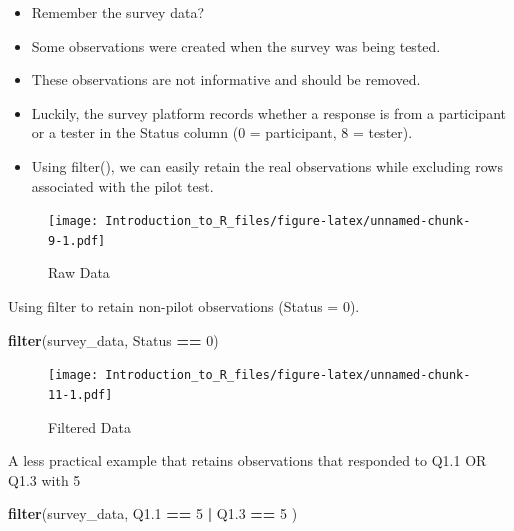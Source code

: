 \documentclass[]{book}
\newenvironment{Shaded}{\begin{snugshade}}{\end{snugshade}}
\newcommand{\DecValTok}[1]{\textcolor[rgb]{0.00,0.00,0.81}{#1}}
\newcommand{\FloatTok}[1]{\textcolor[rgb]{0.00,0.00,0.81}{#1}}
\newcommand{\KeywordTok}[1]{\textcolor[rgb]{0.13,0.29,0.53}{\textbf{#1}}}
\newcommand{\NormalTok}[1]{#1}
\newcommand{\OperatorTok}[1]{\textcolor[rgb]{0.81,0.36,0.00}{\textbf{#1}}}
\newcommand{\StringTok}[1]{\textcolor[rgb]{0.31,0.60,0.02}{#1}}
\providecommand{\tightlist}{%
  \setlength{\itemsep}{0pt}\setlength{\parskip}{0pt}}
\theoremstyle{definition}
\theoremstyle{definition}
\theoremstyle{definition}
\theoremstyle{remark}
\let\BeginKnitrBlock\begin \let\EndKnitrBlock\end
\begin{document}
\begin{itemize}
\tightlist
\item
  Remember the survey data?
\item
  Some observations were created when the survey was being tested.
\item
  These observations are not informative and should be removed.
\item
  Luckily, the survey platform records whether a response is from a participant or a tester in the Status column (0 = participant, 8 = tester).
\item
  Using filter(), we can easily retain the real observations while excluding rows associated with the pilot test.
\end{itemize}

\begin{figure}
\centering
\texttt{[image: Introduction\_to\_R\_files/figure-latex/unnamed-chunk-9-1.pdf]}
\caption{\label{fig:unnamed-chunk-9}Raw Data}
\end{figure}

\BeginKnitrBlock{example}
\protect\hypertarget{exm:filter1}{}{\label{exm:filter1} }Using filter to retain non-pilot observations (Status = 0).
\EndKnitrBlock{example}

\begin{Shaded}
\begin{Highlighting}[]
\KeywordTok{filter}\NormalTok{(survey_data, Status }\OperatorTok{==}\StringTok{ }\DecValTok{0}\NormalTok{)}
\end{Highlighting}
\end{Shaded}

\begin{figure}
\centering
\texttt{[image: Introduction\_to\_R\_files/figure-latex/unnamed-chunk-11-1.pdf]}
\caption{\label{fig:unnamed-chunk-11}Filtered Data}
\end{figure}

\BeginKnitrBlock{example}
\protect\hypertarget{exm:filter2}{}{\label{exm:filter2} }A less practical example that retains observations that responded to Q1.1 OR Q1.3 with 5
\EndKnitrBlock{example}

\begin{Shaded}
\begin{Highlighting}[]
\KeywordTok{filter}\NormalTok{(survey_data, Q1}\FloatTok{.1} \OperatorTok{==}\StringTok{ }\DecValTok{5} \OperatorTok{|}\StringTok{ }\NormalTok{Q1}\FloatTok{.3} \OperatorTok{==}\StringTok{ }\DecValTok{5}\NormalTok{ )}
\end{Highlighting}
\end{Shaded}
\end{document}
